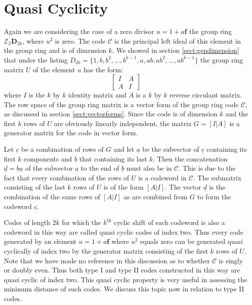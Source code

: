 \section{Quasi Cyclicity}
\label{sect:genquasicyclic}
Again we are considering the case of a zero divisor $u = 1 + a \mathbf{f}$ the group ring $\mathbb{Z}_2 \mathbf{D}_{2k}$, where $u^2$ is zero.
The code $\mathcal{C}$ is the principal left ideal of this element in the group ring and is of dimension $k$.
We showed in section \ref{sect:gendimension} that under the listing $D_{2k} = \{1,b,b^2,\ldots,b^{k-1},a,ab,ab^2,\ldots,ab^{k-1}\}$ the group ring matrix $U$ of the element $u$ has the form:
\[\left[ \begin{array}{c|c}
I & A \\
\hline
A & I
\end{array} \right] \]
where $I$ is the $k$ by $k$ identity matrix and $A$ is a $k$ by $k$ reverse circulant matrix.
The row space of the group ring matrix is a vector form of the group ring code $\mathcal{C}$, as discussed in section \ref{sect:vectorforms}.
Since the code is of dimension $k$ and the first $k$ rows of $U$ are obviously linearly independent, the matrix $G = [I|A]$ is a generator matrix for the code in vector form.

Let $\underline{c}$ be a combination of rows of $G$ and let $\underline{a}$ be the subvector of $\underline{c}$ containing its first $k$ components and $\underline{b}$ that containing its last $k$.
Then the concatenation $\underline{d} = \underline{b} \underline{a}$ of the subvector $\underline{a}$ to the end of $\underline{b}$ must also be in $\mathcal{C}$.
This is due to the fact that every combination of the rows of $U$ is a codeword in $\mathcal{C}$.
The submatrix consisting of the last $k$ rows of $U$ is of the form $[A|I]$.
The vector $\underline{d}$ is the combination of the same rows of $[A|I]$ as are combined from $G$ to form the codeword $\underline{c}$.

Codes of length $2k$ for which the $k^{\textrm{th}}$ cyclic shift of each codeword is also a codeword in this way are called quasi cyclic codes of index two.
Thus every code generated by an element $u = 1 + a \mathbf{f}$ where $u^2$ equals zero can be generated quasi cyclically of index two by the generator matrix consisting of the first $k$ rows of $U$.
Note that we have made no reference in this discussion as to whether $\mathcal{C}$ is singly or doubly even.
Thus both type I and type II codes constructed in this way are quasi cyclic of index two.
This quasi cyclic property is very useful in assessing the minimum distance of such codes.
We discuss this topic now in relation to type II codes.

